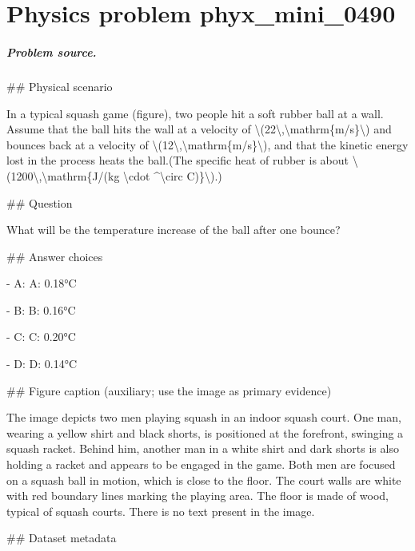 
\chapter{Physics problem phyx\_mini\_0490}
\label{ch:PhyXMiniProblems_problem_phyx_mini_0490}

\paragraph{Problem source.}
\#\# Physical scenario

In a typical squash game (figure), two people hit a soft rubber ball at a wall. Assume that the ball hits the wall at a velocity of \textbackslash{}(22\textbackslash{},\textbackslash{}mathrm\{m/s\}\textbackslash{}) and bounces back at a velocity of \textbackslash{}(12\textbackslash{},\textbackslash{}mathrm\{m/s\}\textbackslash{}), and that the kinetic energy lost in the process heats the ball.(The specific heat of rubber is about \textbackslash{}(1200\textbackslash{},\textbackslash{}mathrm\{J/(kg \textbackslash{}cdot \textasciicircum{}\textbackslash{}circ C)\}\textbackslash{}).)

\#\# Question

What will be the temperature increase of the ball after one bounce?

\#\# Answer choices

- A: A: 0.18°C

- B: B: 0.16°C

- C: C: 0.20°C

- D: D: 0.14°C

\#\# Figure caption (auxiliary; use the image as primary evidence)

The image depicts two men playing squash in an indoor squash court. One man, wearing a yellow shirt and black shorts, is positioned at the forefront, swinging a squash racket. Behind him, another man in a white shirt and dark shorts is also holding a racket and appears to be engaged in the game. Both men are focused on a squash ball in motion, which is close to the floor. The court walls are white with red boundary lines marking the playing area. The floor is made of wood, typical of squash courts. There is no text present in the image.

\#\# Dataset metadata

